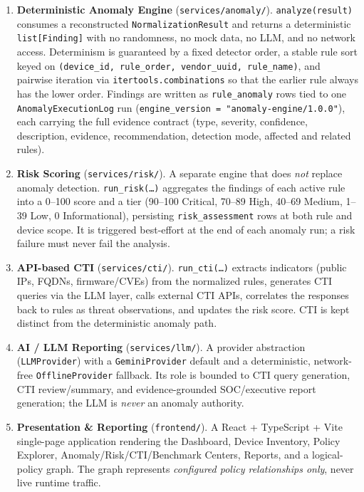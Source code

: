 \begin{enumerate}[leftmargin=2.2em]
  \item \textbf{Deterministic Anomaly Engine} (\texttt{services/anomaly/}). \texttt{analyze(result)} consumes a reconstructed \texttt{NormalizationResult} and returns a deterministic \texttt{list[Finding]} with no randomness, no mock data, no LLM, and no network access. Determinism is guaranteed by a fixed detector order, a stable rule sort keyed on \texttt{(device\_id, rule\_order, vendor\_uuid, rule\_name)}, and pairwise iteration via \texttt{itertools.combinations} so that the earlier rule always has the lower order. Findings are written as \texttt{rule\_anomaly} rows tied to one \texttt{AnomalyExecutionLog} run (\texttt{engine\_version = "anomaly-engine/1.0.0"}), each carrying the full evidence contract (type, severity, confidence, description, evidence, recommendation, detection mode, affected and related rules).
  \item \textbf{Risk Scoring} (\texttt{services/risk/}). A separate engine that does \emph{not} replace anomaly detection. \texttt{run\_risk(\dots)} aggregates the findings of each active rule into a 0--100 score and a tier (90--100 Critical, 70--89 High, 40--69 Medium, 1--39 Low, 0 Informational), persisting \texttt{risk\_assessment} rows at both rule and device scope. It is triggered best-effort at the end of each anomaly run; a risk failure must never fail the analysis.
  \item \textbf{API-based CTI} (\texttt{services/cti/}). \texttt{run\_cti(\dots)} extracts indicators (public IPs, FQDNs, firmware/CVEs) from the normalized rules, generates CTI queries via the LLM layer, calls external CTI APIs, correlates the responses back to rules as threat observations, and updates the risk score. CTI is kept distinct from the deterministic anomaly path.
  \item \textbf{AI / LLM Reporting} (\texttt{services/llm/}). A provider abstraction (\texttt{LLMProvider}) with a \texttt{GeminiProvider} default and a deterministic, network-free \texttt{OfflineProvider} fallback. Its role is bounded to CTI query generation, CTI review/summary, and evidence-grounded SOC/executive report generation; the LLM is \emph{never} an anomaly authority.
  \item \textbf{Presentation \& Reporting} (\texttt{frontend/}). A React + TypeScript + Vite single-page application rendering the Dashboard, Device Inventory, Policy Explorer, Anomaly/Risk/CTI/Benchmark Centers, Reports, and a logical-policy graph. The graph represents \emph{configured policy relationships only}, never live runtime traffic.
\end{enumerate}

